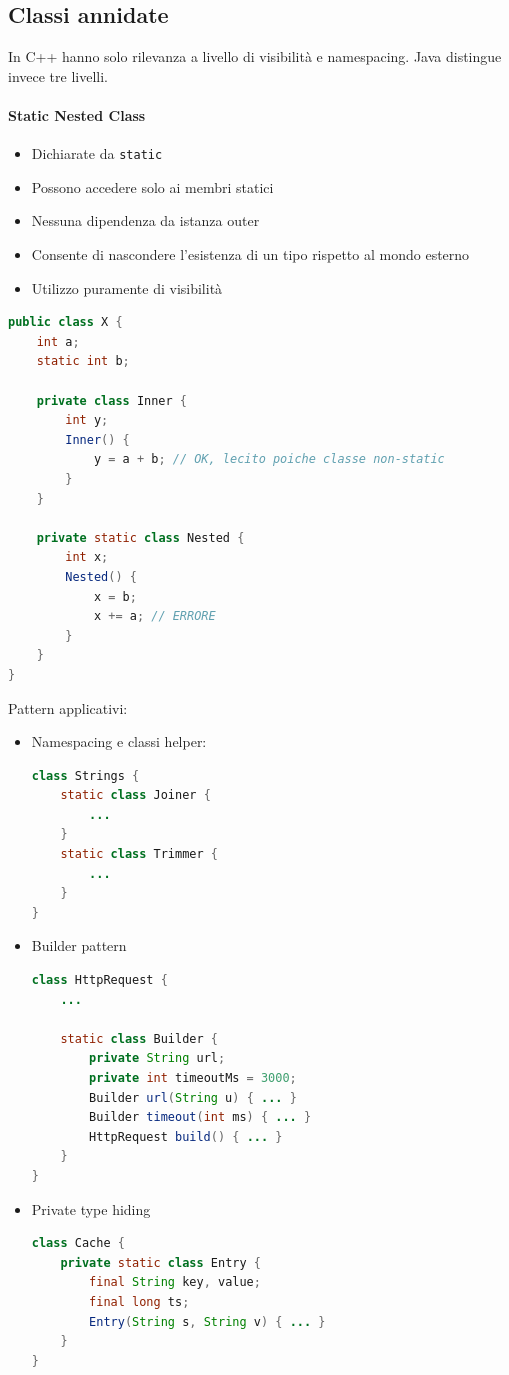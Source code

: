 \documentclass[12pt]{extarticle}
\begin{document}
\subsection{Classi annidate} In C++ hanno solo rilevanza a livello di visibilità e namespacing. Java distingue invece tre livelli.

\paragraph{Static Nested Class} 
\begin{itemize}
    \item Dichiarate da \texttt{static}
    \item Possono accedere solo ai membri statici
    \item Nessuna dipendenza da istanza outer
    \item Consente di nascondere l'esistenza di un tipo rispetto al mondo esterno
    \item Utilizzo puramente di visibilità
\end{itemize}

\begin{lstlisting}[language=Java]
public class X {
    int a;
    static int b;

    private class Inner {
        int y;
        Inner() {
            y = a + b; // OK, lecito poiche classe non-static
        }
    }

    private static class Nested {
        int x;
        Nested() {
            x = b;
            x += a; // ERRORE
        }
    }
}
\end{lstlisting}

\noindent Pattern applicativi:
\begin{itemize}
    \item Namespacing e classi helper:
    \begin{lstlisting}[language=Java]
class Strings {
    static class Joiner {
        ...
    }
    static class Trimmer {
        ...
    }
}        
    \end{lstlisting}
    \item Builder pattern
    \begin{lstlisting}[language=Java]
class HttpRequest {
    ...

    static class Builder {
        private String url;
        private int timeoutMs = 3000;
        Builder url(String u) { ... }
        Builder timeout(int ms) { ... }
        HttpRequest build() { ... }
    }
}
    \end{lstlisting}
    \item Private type hiding
    \begin{lstlisting}[language=Java]
class Cache {
    private static class Entry {
        final String key, value;
        final long ts;
        Entry(String s, String v) { ... }
    }
}
    \end{lstlisting}
\end{itemize}
\end{document}
